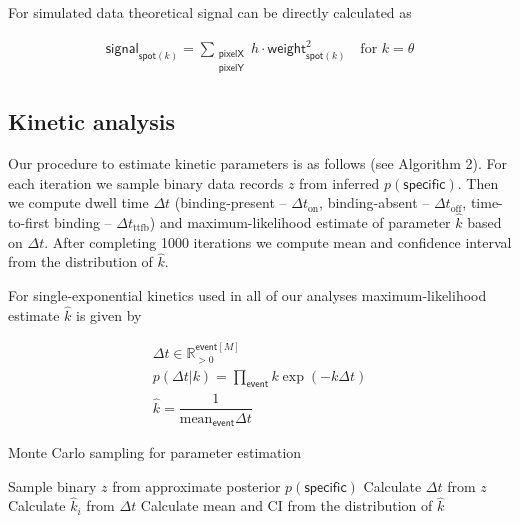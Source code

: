 For simulated data theoretical signal can be directly calculated as

\begin{gather*}
    \mathsf{signal}_{\mathsf{spot}(k)} =  \sum_{\substack{\mathsf{pixelX} \\ \mathsf{pixelY}}} h \cdot \mathsf{weight}_{\mathsf{spot}(k)}^2 \quad \textrm{for } k = \theta
\end{gather*}

\subsection*{Kinetic analysis}

Our procedure to estimate kinetic parameters is as follows (see Algorithm 2). For each iteration we sample binary data records $z$ from inferred $p(\mathsf{specific})$. Then we compute dwell time $\Delta t$ (binding-present -- $\Delta t_\mathrm{on}$, binding-absent -- $\Delta t_\mathrm{off}$, time-to-first binding -- $\Delta t_\mathrm{ttfb}$) and maximum-likelihood estimate of parameter $\hat{k}$ based on $\Delta t$. After completing 1000 iterations we compute mean and confidence interval from the distribution of $\hat{k}$.

For single-exponential kinetics used in all of our analyses maximum-likelihood estimate $\hat{k}$ is given by

\begin{gather*}
    \Delta t \in \mathbb{R}_{>0}^{\mathsf{event}[M]} \\
    p(\Delta t | k) = \prod_\mathsf{event} k \exp (- k \Delta t) \\
    \hat{k} = \dfrac{1}{\mathrm{mean}_{\mathsf{event}} \Delta t}
\end{gather*}

\begin{algorithm}
\caption{Monte Carlo sampling for parameter estimation}
\begin{algorithmic}[1]
    \State Sample binary $z$ from approximate posterior $p(\mathsf{specific})$
    \State Calculate $\Delta t$ from $z$
    \State Calculate $\hat{k}_i$ from $\Delta t$
\EndFor{}
\State Calculate mean and CI from the distribution of $\hat{k}$
\end{algorithmic}
\end{algorithm}
